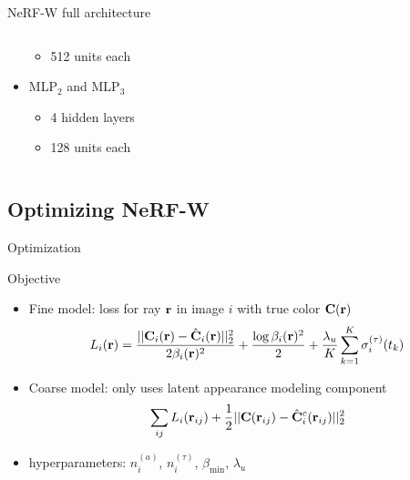 \documentclass[aspectratio=1610]{beamer}
\begin{document}
\begin{frame}{NeRF-W full architecture}
\begin{onlyenv}
\begin{columns}
\begin{column}{.3\textwidth}
\begin{itemize}
\begin{itemize}
                        \item 512 units each
                    \end{itemize}
                    \item MLP\(_2\) and MLP\(_3\)
                    \begin{itemize}
                        \item 4 hidden layers
                        \item 128 units each
                    \end{itemize}
                \end{itemize}
            \end{column}
        \end{columns}

    \end{onlyenv}
\end{frame}

\subsection{Optimizing NeRF-W}
\begin{frame}{Optimization}
    \begin{block}{Objective}
        \begin{itemize}
            \item Fine model: loss for ray \(\vb{r}\) in image \(i\) with true color \(\vb{C}(\vb{r})\)
            \begin{equation*}
                L_i(\vb{r}) 
                = \frac{|| \vb{C}_i (\vb{r}) - \hat{\vb{C}}_i (\vb{r}) ||_2^2}{2\beta_i (\vb{r})^2} 
                + \frac{\log \beta_i (\vb{r})^2}{2} 
                + \frac{\lambda_u}{K} \sum^K_{k=1}\sigma_i^{(\tau)} (t_k)
            \end{equation*}
            \item Coarse model: only uses latent appearance modeling component
            \begin{equation*}
                \sum_{ij} L_i (\vb{r}_{ij}) + \frac{1}{2} || \vb{C} (\vb{r}_{ij}) - \hat{\vb{C}}_i^c (\vb{r}_{ij}) ||^2_2 
            \end{equation*}
            \item hyperparameters: \(n_i^{(a)}\), \(n_i^{(\tau)}\), \(\beta_{\textrm{min}}\), \(\lambda_u\)
        \end{itemize}
    \end{block}  
\end{frame}
\end{document}
